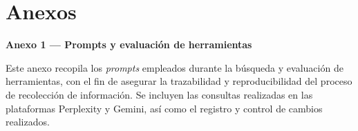\documentclass{prgrado}
\begin{document}
{ %

\backmatter %


\newpage



} %



\cleardoublepage
{}
\chapter*{Anexos}
\label{cap:anexo}

\vspace{0.75\baselineskip}
{\large\bfseries Anexo 1 — Prompts y evaluación de herramientas\par}
\vspace{0.25\baselineskip}


Este anexo recopila los \textit{prompts} empleados durante la búsqueda y evaluación de herramientas, con el fin de asegurar la trazabilidad y reproducibilidad del proceso de recolección de información. Se incluyen las consultas realizadas en las plataformas Perplexity y Gemini, así como el registro y control de cambios realizados.
\end{document}
